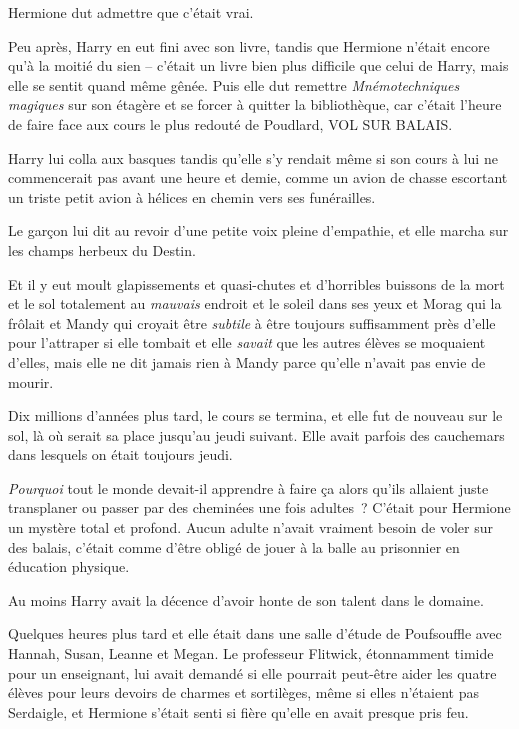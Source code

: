 Hermione dut admettre que c'était vrai.

Peu après, Harry en eut fini avec son livre, tandis que Hermione n'était encore qu'à la moitié du sien -- c'était un livre bien plus difficile que celui de Harry, mais elle se sentit quand même gênée. Puis elle dut remettre \emph{Mnémotechniques magiques} sur son étagère et se forcer à quitter la bibliothèque, car c'était l'heure de faire face aux cours le plus redouté de Poudlard, VOL SUR BALAIS.

Harry lui colla aux basques tandis qu'elle s'y rendait même si son cours à lui ne commencerait pas avant une heure et demie, comme un avion de chasse escortant un triste petit avion à hélices en chemin vers ses funérailles.

Le garçon lui dit au revoir d'une petite voix pleine d'empathie, et elle marcha sur les champs herbeux du Destin.

Et il y eut moult glapissements et quasi-chutes et d'horribles buissons de la mort et le sol totalement au \emph{mauvais} endroit et le soleil dans ses yeux et Morag qui la frôlait et Mandy qui croyait être \emph{subtile} à être toujours suffisamment près d'elle pour l'attraper si elle tombait et elle \emph{savait} que les autres élèves se moquaient d'elles, mais elle ne dit jamais rien à Mandy parce qu'elle n'avait pas envie de mourir.

Dix millions d'années plus tard, le cours se termina, et elle fut de nouveau sur le sol, là où serait sa place jusqu'au jeudi suivant. Elle avait parfois des cauchemars dans lesquels on était toujours jeudi.

\emph{Pourquoi} tout le monde devait-il apprendre à faire ça alors qu'ils allaient juste transplaner ou passer par des cheminées une fois adultes~? C'était pour Hermione un mystère total et profond. Aucun adulte n'avait vraiment besoin de voler sur des balais, c'était comme d'être obligé de jouer à la balle au prisonnier en éducation physique.

Au moins Harry avait la décence d'avoir honte de son talent dans le domaine.

\later

Quelques heures plus tard et elle était dans une salle d'étude de Poufsouffle avec Hannah, Susan, Leanne et Megan. Le professeur Flitwick, étonnamment timide pour un enseignant, lui avait demandé si elle pourrait peut-être aider les quatre élèves pour leurs devoirs de charmes et sortilèges, même si elles n'étaient pas Serdaigle, et Hermione s'était senti si fière qu'elle en avait presque pris feu.

